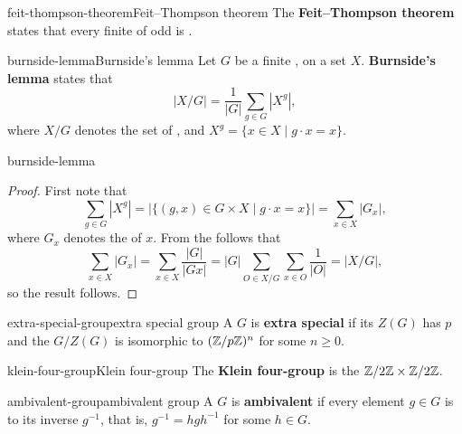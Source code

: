 \begin{topic}{feit-thompson-theorem}{Feit--Thompson theorem}
    The \textbf{Feit--Thompson theorem} states that every finite  of odd  is .
\end{topic}

\begin{topic}{burnside-lemma}{Burnside's lemma}
    Let $G$ be a finite ,  on a set $X$. \textbf{Burnside's lemma} states that
    \[ |X/G| = \frac{1}{|G|} \sum_{g \in G} |X^g| , \]
    where $X/G$ denotes the set of , and $X^g = \{ x \in X \mid g \cdot x = x \}$.
\end{topic}

\begin{example}{burnside-lemma}
    \begin{proof}
        First note that
        \[ \sum_{g \in G} |X^g| = |\{ (g, x) \in G \times X \mid g \cdot x = x \}| = \sum_{x \in X} |G_x| , \]
        where $G_x$ denotes the  of $x$. From the  follows that
        \[ \sum_{x \in X} |G_x| = \sum_{x \in X} \frac{|G|}{|G x|} = |G| \sum_{O \in X/G} \sum_{x \in O} \frac{1}{|O|} = |X/G| , \]
        so the result follows.
    \end{proof}
\end{example}

\begin{topic}{extra-special-group}{extra special group}
    A  $G$ is \textbf{extra special} if its  $Z(G)$ has  $p$ and the  $G / Z(G)$ is isomorphic to $(\mathbb{Z} / p \mathbb{Z})^n$ for some $n \ge 0$.
\end{topic}

\begin{topic}{klein-four-group}{Klein four-group}
    The \textbf{Klein four-group} is the  $\mathbb{Z}/2\mathbb{Z} \times \mathbb{Z}/2\mathbb{Z}$.
\end{topic}

\begin{topic}{ambivalent-group}{ambivalent group}
    A  $G$ is \textbf{ambivalent} if every element $g \in G$ is  to its inverse $g^{-1}$, that is, $g^{-1} = hgh^{-1}$ for some $h \in G$.
\end{topic}

